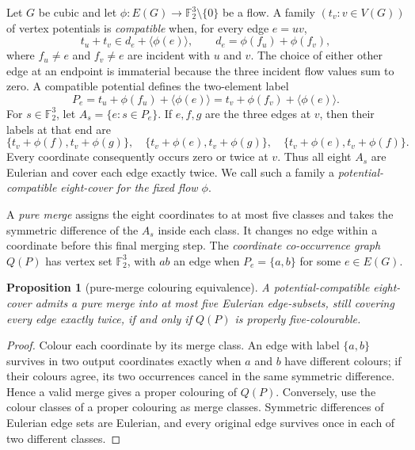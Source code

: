 \documentclass[11pt]{article}
\newtheorem{proposition}[theorem]{Proposition}
\theoremstyle{definition}
\theoremstyle{remark}
\newcommand{\F}{\mathbb F}
\begin{document}
Let \(G\) be cubic and let
\(\phi:E(G)\to\F_2^3\setminus\{0\}\) be a flow.  A family
\((t_v:v\in V(G))\) of vertex potentials is \emph{compatible} when, for
every edge \(e=uv\),
\[
 t_u+t_v\in d_e+\langle\phi(e)\rangle,\qquad
 d_e=\phi(f_u)+\phi(f_v),                                      \tag{P}
\]
where \(f_u\ne e\) and \(f_v\ne e\) are incident with \(u\) and \(v\).
The choice of either other edge at an endpoint is immaterial because the
three incident flow values sum to zero.  A compatible potential defines
the two-element label
\[
 P_e=t_u+\phi(f_u)+\langle\phi(e)\rangle
     =t_v+\phi(f_v)+\langle\phi(e)\rangle.                       \tag{L}
\]
For \(s\in\F_2^3\), let \(A_s=\{e:s\in P_e\}\).  If \(e,f,g\) are the
three edges at \(v\), then their labels at that end are
\[
 \{t_v+\phi(f),t_v+\phi(g)\},\quad
 \{t_v+\phi(e),t_v+\phi(g)\},\quad
 \{t_v+\phi(e),t_v+\phi(f)\}.
\]
Every coordinate consequently occurs zero or twice at \(v\).  Thus all
eight \(A_s\) are Eulerian and cover each edge exactly twice.  We call
such a family a \emph{potential-compatible eight-cover for the fixed flow
\(\phi\)}.

A \emph{pure merge} assigns the eight coordinates to at most five
classes and takes the symmetric difference of the \(A_s\) inside each
class.  It changes no edge within a coordinate before this final merging
step.  The \emph{coordinate co-occurrence graph} \(Q(P)\) has vertex set
\(\F_2^3\), with \(ab\) an edge when \(P_e=\{a,b\}\) for some
\(e\in E(G)\).

\begin{proposition}[pure-merge colouring equivalence]
\label{prop:pure-colour}
A potential-compatible eight-cover admits a pure merge into at most five
Eulerian edge-subsets, still covering every edge exactly twice, if and
only if \(Q(P)\) is properly five-colourable.
\end{proposition}

\begin{proof}
Colour each coordinate by its merge class.  An edge with label
\(\{a,b\}\) survives in two output coordinates exactly when \(a\) and
\(b\) have different colours; if their colours agree, its two
occurrences cancel in the same symmetric difference.  Hence a valid
merge gives a proper colouring of \(Q(P)\).  Conversely, use the colour
classes of a proper colouring as merge classes.  Symmetric differences
of Eulerian edge sets are Eulerian, and every original edge survives
once in each of two different classes.
\end{proof}
\end{document}
